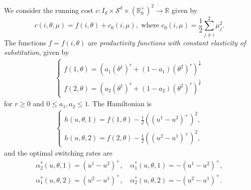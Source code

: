 \documentclass[12pt]{amsart}
\newcommand{\Rr}{{\mathbb{R}}}
\newcommand{\1}{{\chi}}
\newcommand{\lb}{\left(}
\newcommand{\rb}{\right)}
\newcommand{\Ss}{\mathcal{S}}
\theoremstyle{definition}
\begin{document}
        We consider the running cost $c:I_d\times \Ss^d \times (\Rr_0^+)^2\to \Rr$ given by
        \begin{equation*}
                c(i,\theta,\mu) = f(i,\theta) + c_0(i,\mu), \text{ where } c_0(i,\mu) = \frac{1}{2} \sum_{j\neq i}^2 \mu^2_j.
        \end{equation*}
        The functions $f=f(i,\theta)$ are \emph{productivity functions with constant elasticity of substitution}, given by
        \begin{align*}
        \begin{cases}
                f(1,\theta) = \lb a_1 (\theta^1)^r + (1-a_1)(\theta^2)^r\rb^{\frac{1}{r}}\\
                f(2,\theta) = \lb a_2 (\theta^1)^r+ (1-a_2)(\theta^2)^r\rb^{\frac{1}{r}} 
        \end{cases}        
        \end{align*}
        for $r\geq 0$ and $0\leq a_1, a_2\leq 1$.
        The Hamiltonian is 
        \begin{align*}
        \begin{cases}
                h(u,\theta,1) = f(1,\theta) - \frac{1}{2}\lb (u^1-u^2)^+\rb^2,\\
                h(u,\theta,2) = f(2,\theta) - \frac{1}{2}\lb (u^2-u^1)^+\rb^2,
        \end{cases}        
        \end{align*}
        and the optimal switching rates are 
        \begin{align*}
                \alpha_2^*(u,\theta, 1) =  (u^1-u^2)^+, \quad \alpha_1^*(u,\theta, 1) = -(u^1-u^2)^+,\\
                \alpha_1^*(u,\theta, 2) =  (u^2-u^1)^+, \quad \alpha_2^*(u,\theta, 2) = -(u^2-u^1)^+.
        \end{align*} 
                
\end{document}
